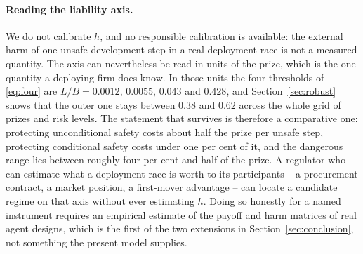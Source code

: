 \documentclass[pdflatex]{sn-jnl}
\theoremstyle{thmstyleone}
\theoremstyle{thmstylethree}
\theoremstyle{thmstyletwo}
\begin{document}
\paragraph{Reading the liability axis.}
We do not calibrate $h$, and no responsible calibration is available: the
external harm of one unsafe development step in a real deployment race is not
a measured quantity. The axis can nevertheless be read in units of the prize,
which is the one quantity a deploying firm does know. In those units the four
thresholds of \eqref{eq:four} are $L/B=0.0012$, $0.0055$, $0.043$ and $0.428$,
and Section~\ref{sec:robust} shows that the outer one stays between $0.38$ and
$0.62$ across the whole grid of prizes and risk levels. The statement that
survives is therefore a comparative one: protecting unconditional safety costs
about half the prize per unsafe step, protecting conditional safety costs
under one per cent of it, and the dangerous range lies between roughly four
per cent and half of the prize. A regulator who can estimate what a deployment
race is worth to its participants -- a procurement contract, a market
position, a first-mover advantage -- can locate a candidate regime on that
axis without ever estimating $h$. Doing so honestly for a named instrument
requires an empirical estimate of the payoff and harm matrices of real agent
designs, which is the first of the two extensions in
Section~\ref{sec:conclusion}, not something the present model supplies.
\end{document}
